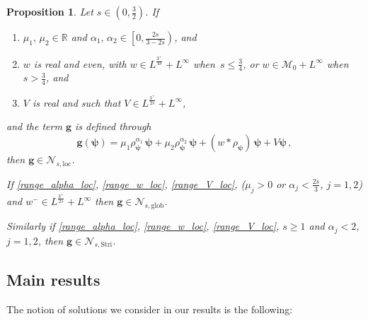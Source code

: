 \documentclass[12pt,a4paper]{amsart}
\newtheorem{prop}[theorem]{Proposition}
\numberwithin{equation}{section}
\newcommand{\ulg}{\boldsymbol{g}}
\newcommand{\ulpsi}{\boldsymbol{\psi}}
\newcommand{\Nloc}{\mathscr{N}_{s,\mathrm{loc}}}
\newcommand{\Nglob}{\mathscr{N}_{s,\mathrm{glob}}}
\newcommand{\NStri}{\mathscr{N}_{s,\mathrm{Stri}}}
\begin{document}
	\begin{prop}
		Let $s\in (0,\frac{3}{2})$. If
		\begin{enumerate}[label=(\roman*)]
			\item\label{range_alpha_loc} $\mu_1,\,\mu_2\in\mathbb{R}$ and $\alpha_1,\,\alpha_2\in \left[0,\frac{2s}{3-2s}\right)$, and
			\item\label{range_w_loc} $w$ is real and even, with $w\in L^{\frac{3^+}{4s}}+L^\infty$ when~$s\leq \frac{3}{4}$, or 
			$w\in \mathcal{M}_0+L^\infty$ when~$s> \frac{3}{4}$, and
			\item\label{range_V_loc} $V$ is real and such that $V\in L^{\frac{3^+}{2s}}+L^\infty$,
		\end{enumerate}
		and the term $\ulg$ is defined through
		\begin{equation}
			\ulg(\ulpsi) = \mu_1 \rho_{\ulpsi}^{\alpha_1} \, \ulpsi + \mu_2 \rho_{\ulpsi}^{\alpha_2} \, \ulpsi + (w*\rho_{\ulpsi}) \, \ulpsi + V\ulpsi\,,
		\end{equation}
		then $\ulg\in\Nloc$.
		
		If \ref{range_alpha_loc}, \ref{range_w_loc}, \ref{range_V_loc}, ($\mu_{j}>0$ or $\alpha_j<\frac{2s}{3}$, $j=1,2$) and $w^{-} \in L^{\frac{3^+}{2s}}+L^\infty$
		then $\ulg\in\Nglob$.
		
		Similarly if \ref{range_alpha_loc}, \ref{range_w_loc}, \ref{range_V_loc}, $s\geq 1$ and $\alpha_j<2$, $j=1,2$, then $\ulg\in\NStri$.
		
	\end{prop}
	
	
	
	
	
	
	
	
	
	\subsection{Main results}
	
	The notion of solutions we consider in our results is the following:
	
\end{document}
